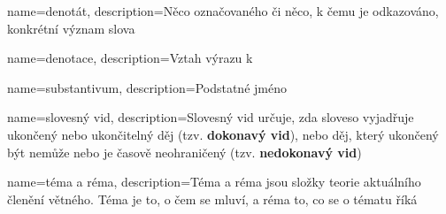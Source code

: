 {
	name=denotát,
	description={Něco označovaného či něco, k čemu je odkazováno, konkrétní význam slova}
}

{
	name=denotace,
	description={Vztah výrazu k }
}

{
	name=substantivum,
	description={Podstatné jméno}
}

{
	name=slovesný vid,
	description={Slovesný vid určuje, zda sloveso vyjadřuje ukončený nebo ukončitelný děj (tzv. \textbf{dokonavý vid}), nebo děj, který ukončený být nemůže nebo je časově neohraničený (tzv. \textbf{nedokonavý vid})}
}

{
	name=téma a réma,
	description={Téma a réma jsou složky teorie aktuálního členění větného. Téma je to, o čem se mluví, a réma to, co se o tématu říká }
}





